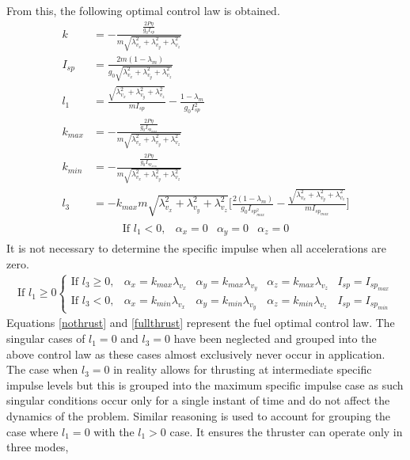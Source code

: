 From this, the following optimal control law is obtained.
\begin{align}
	k&=-\frac{\frac{2P\eta}{g_0 I_{sp}}}{m\sqrt{\lambda_{v_x}^2+\lambda_{v_y}^2+\lambda_{v_z}^2}}\\
	I_{sp}&=\frac{2m(1-\lambda_m)}{g_0\sqrt{\lambda_{v_x}^2+\lambda_{v_y}^2+\lambda_{v_z}^2}}\\
	l_1&=\frac{\sqrt{\lambda_{v_x}^2+\lambda_{v_y}^2+\lambda_{v_z}^2}}{mI_{sp}}-\frac{1-\lambda_m}{g_0 I_{sp}^2}\\
	k_{max}&=-\frac{\frac{2P\eta}{g_0 I_{sp_{max}}}}{m\sqrt{\lambda_{v_x}^2+\lambda_{v_y}^2+\lambda_{v_z}^2}}\\
	k_{min}&=-\frac{\frac{2P\eta}{g_0 I_{sp_{min}}}}{m\sqrt{\lambda_{v_x}^2+\lambda_{v_y}^2+\lambda_{v_z}^2}}\\
	l_3&=-k_{max}m\sqrt{\lambda_{v_x}^2+\lambda_{v_y}^2+\lambda_{v_z}^2}\bigg[\frac{2(1-\lambda_m)}{g_0 I_{sp_{max}^2}}-\frac{\sqrt{\lambda_{v_x}^2+\lambda_{v_y}^2+\lambda_{v_z}^2}}{m I_{sp_{max}}}\bigg]
\end{align}
\begin{align}
\begin{array}{cccc}
\text{If } l_1<0, &\alpha_x=0  &\alpha_y=0 &\alpha_z=0 \label{nothrust}
\end{array}
\end{align}
It is not necessary to determine the specific impulse when all accelerations are zero.
\begin{align}
\text{If }l_1\geq 0\left \{
\begin{array}{ccccc}
\text{If } l_3\geq 0, &\alpha_x=k_{max}\lambda_{v_x}&\alpha_y=k_{max}\lambda_{v_y} &\alpha_z=k_{max}\lambda_{v_z} &I_{sp}=I_{sp_{max}}\\
\text{If } l_3< 0, &\alpha_x=k_{min}\lambda_{v_x} &\alpha_y=k_{min}\lambda_{v_y} &\alpha_z=k_{min}\lambda_{v_z} &I_{sp}=I_{sp_{min}}
\end{array}
\right.\label{fullthrust}
\end{align}
Equations \ref{nothrust} and \ref{fullthrust} represent the fuel optimal control law. The singular cases of $l_1=0$ and $l_3=0$ have been neglected and grouped into the above control law as these cases almost exclusively never occur in application. The case when $l_3=0$ in reality allows for thrusting at intermediate specific impulse levels but this is grouped into the maximum specific impulse case as such singular conditions occur only for a single instant of time and do not affect the dynamics of the problem. Similar reasoning is used to account for grouping the case where $l_1=0$ with the $l_1>0$ case.  It ensures the thruster can operate only in three modes, 
